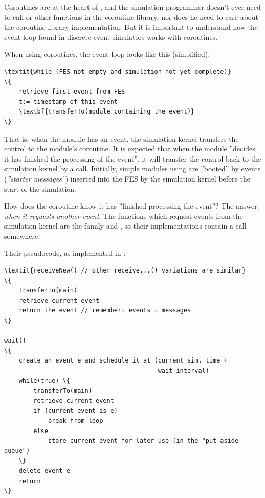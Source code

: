 Coroutines are at the heart of {\opp}, and the
simulation programmer doesn't ever need to call 
or other functions in the coroutine library, nor does he need to care
about the coroutine library implementation. But it is important to
understand how the event loop found in discrete event simulators works
with coroutines.


When using coroutines, the event loop looks like
this (simplified):


\begin{Verbatim}[commandchars=\\\{\}]
\textit{while (FES not empty and simulation not yet complete)}
\{
    retrieve first event from FES
    t:= timestamp of this event
    \textbf{transferTo(module containing the event)}
\}
\end{Verbatim}



That is, when the module has an event, the simulation
kernel transfers the control to the module's coroutine. It is expected
that when the module ''decides it has finished the processing of the
event'', it will transfer the control back to the simulation kernel by
a  call. Initially,
simple modules using  are
''booted'' by events (\textit{''starter messages''})
inserted into the FES by the simulation kernel before the
start of the simulation.


How does the coroutine know it has ''finished processing the event''?
The answer: \textit{when it requests another event}.  The functions
which request events from the simulation kernel are the
 family and , so their
implementations contain a  call
somewhere.


Their pseudocode, as implemented in {\opp}:


\begin{Verbatim}[commandchars=\\\{\}]
\textit{receiveNew() // other receive...() variations are similar}
\{
    transferTo(main)
    retrieve current event
    return the event // remember: events = messages
\}

wait()
\{
    create an event e and schedule it at (current sim. time +
                                          wait interval)
    while(true) \{
        transferTo(main)
        retrieve current event
        if (current event is e)
            break from loop
        else
            store current event for later use (in the "put-aside queue")
    \}
    delete event e
    return
\}
\end{Verbatim}



